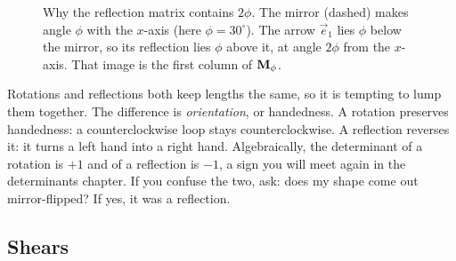\begin{figure}[htbp]
\centering
{}
\caption{Why the reflection matrix contains $2\phi$. The mirror (dashed) makes
angle $\phi$ with the $x$-axis (here $\phi=30^\circ$). The arrow $\vec{e}_1$ lies
$\phi$ below the mirror, so its reflection lies $\phi$ above it, at angle $2\phi$
from the $x$-axis. That image is the first column of $\mathbf{M}_\phi$.}
\label{ch05:fig-reflection-phi}
\end{figure}

\begin{trapbox}
Rotations and reflections both keep lengths the same, so it is tempting to lump
them together. The difference is \emph{orientation}, or handedness. A rotation preserves
handedness: a counterclockwise loop stays counterclockwise. A reflection reverses
it: it turns a left hand into a right hand. Algebraically, the determinant of a
rotation is $+1$ and of a reflection is $-1$, a sign you will meet again in the
determinants chapter. If you confuse the two, ask: does my shape come out
mirror-flipped? If yes, it was a reflection.
\end{trapbox}

\subsection{Shears}
\label{ch05:shears}

